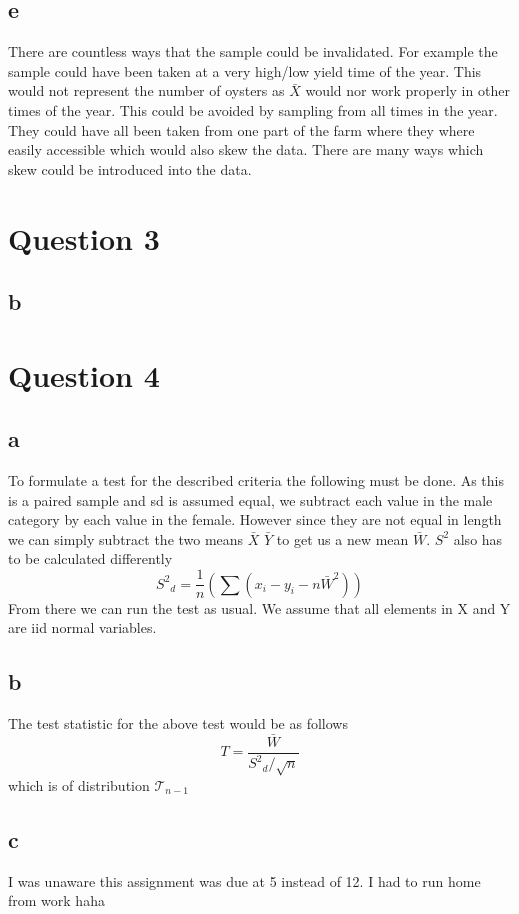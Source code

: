 \documentclass[a4paper, 12pt]{article}
\begin{document}
    \subsection{e}
        There are countless ways that the sample could be invalidated. For example the sample could have been taken at a very high/low yield time of the year. This would not represent the number of oysters as $\bar{X}$ would nor work properly in other times of the year. This could be avoided by sampling from all times in the year. They could have all been taken from one part of the farm where they where easily accessible which would also skew the data. There are many ways which skew could be introduced into the data.
    \pagebreak
    \section{Question 3}
    \subsection{b}
     
    \section{Question 4}
    \subsection{a}
        To formulate a test for the described criteria the following must be done. As this is a paired sample and sd is assumed equal, we subtract each value in the male category by each value in the female. However since they are not equal in length we can simply subtract the two means $\bar{X}$ $\bar{Y}$ to get us a new mean $\bar{W}$. $S^2$ also has to be calculated differently \[{S^2}_d = \frac{1} {n}(\sum (x_i - y_i - n\bar{W}^2))\] From there we can run the test as usual. We assume that all elements in X and Y are iid normal variables.

    \subsection{b}
        The test statistic for the above test would be as follows
        \[ T = \frac {\bar{W}} {{S^2}_d / \sqrt{n} }\] which is of distribution $\mathcal{T}_{n-1}$

    \subsection{c}
    I was unaware this assignment was due at 5 instead of 12. I had to run home from work haha
\end{document}

